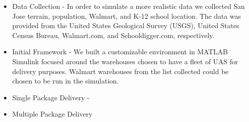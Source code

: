
\begin{itemize}
\item{Data Collection - In order to simulate a more realistic data we collected San Jose terrain, population, Walmart, and K-12 school location. The data was provided from the United States Geological Survey (USGS), United States Census Bureau, Walmart.com, and Schooldigger.com, respectively. }
\item{Initial Framework - We built a customizable environment in MATLAB Simulink focused around the warehouses chosen to have a fleet of UAS for delivery purposes. Walmart warehouses from the list collected could be chosen to be run in the simulation.}
\item{Single Package Delivery - }
\item{Multiple Package Delivery }
\end{itemize}
